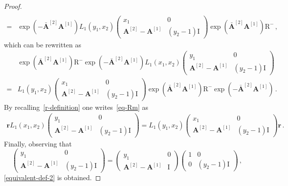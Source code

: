 \documentclass[11pt]{article}
\numberwithin{equation}{section}
\newcommand{\OA}{\mathbf{A}}
\newcommand{\OAD}{\mathbf{\bar{A}}}
\newcommand{\ID}{\mathrm{I}}
\newcommand{\abrOSCR}{\mathrm{R}}
\begin{document}
\begin{proof}
\begin{equation}
\begin{split}
		\\=&
		\exp{\left(-\OAD^{[2]}\OA^{[1]}\right)}L_{1}(y_{1},x_{2})\left(\begin{array}{cc}
			x_1&0\\
			\OA^{[2]}-\OA^{[1]}&(y_{2}-1)\ID
		\end{array}\right)\exp{\left(\OAD^{[2]}\OA^{[1]}\right)}\abrOSCR^{-}\,,
	\end{split}
\end{equation}
which can be rewritten as
\begin{equation}
	\begin{split}
		&\exp{\left(\OAD^{[2]}\OA^{[1]}\right)}\abrOSCR^{-}\exp{\left(-\OAD^{[2]}\OA^{[1]}\right)}L_{1}(x_{1},x_{2})\left(\begin{array}{cc}
			y_1&0\\
			\OA^{[2]}-\OA^{[1]}&(y_{2}-1)\ID
		\end{array}\right)
		\\=&
		L_{1}(y_{1},x_{2})\left(\begin{array}{cc}
			x_1&0\\
			\OA^{[2]}-\OA^{[1]}&(y_{2}-1)\ID
		\end{array}\right)\exp{\left(\OAD^{[2]}\OA^{[1]}\right)}\abrOSCR^{-}\exp{\left(-\OAD^{[2]}\OA^{[1]}\right)}\,.
	\end{split}
\end{equation}
By recalling~\eqref{r-definition}
one writes~\eqref{eq-Rm} as
\begin{equation}\label{equivalent-def}
	\begin{split}
		\mathbf{r}L_{1}(x_{1},x_{2})\left(\begin{array}{cc}
			y_1&0\\
			\OA^{[2]}-\OA^{[1]}&(y_{2}-1)\ID
		\end{array}\right)=
		L_{1}(y_{1},x_{2})\left(\begin{array}{cc}
			x_1&0\\
			\OA^{[2]}-\OA^{[1]}&(y_{2}-1)\ID
		\end{array}\right)\mathbf{r}\,.
	\end{split}
\end{equation}
Finally,  observing that
\begin{equation}
	\left(\begin{array}{cc}
			y_1&0\\
			\OA^{[2]}-\OA^{[1]}&(y_{2}-1)\ID
		\end{array}\right)=\left(\begin{array}{cc}
		y_1&0\\
		\OA^{[2]}-\OA^{[1]}&\ID
	\end{array}\right)\left(\begin{array}{cc}
		1&0\\
		0&(y_{2}-1)\ID
	\end{array}\right)\,,
\end{equation}
\eqref{equivalent-def-2} is obtained.


\end{proof}
\end{document}
